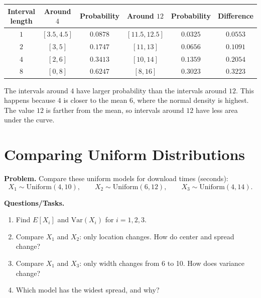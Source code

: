 \begin{enumerate}[label=\textbf{\alph*)}]
	
	\begin{center}
		\begin{tabular}{c c c c c c}
			\hline
			Interval length & Around \(4\) & Probability & Around \(12\) & Probability & Difference \\
			\hline
			\(1\) & \([3.5,4.5]\) & \(0.0878\) & \([11.5,12.5]\) & \(0.0325\) & \(0.0553\) \\
			\(2\) & \([3,5]\) & \(0.1747\) & \([11,13]\) & \(0.0656\) & \(0.1091\) \\
			\(4\) & \([2,6]\) & \(0.3413\) & \([10,14]\) & \(0.1359\) & \(0.2054\) \\
			\(8\) & \([0,8]\) & \(0.6247\) & \([8,16]\) & \(0.3023\) & \(0.3223\) \\
			\hline
		\end{tabular}
	\end{center}
	
	The intervals around \(4\) have larger probability than the intervals around \(12\). This happens because \(4\) is closer to the mean \(6\), where the normal density is highest. The value \(12\) is farther from the mean, so intervals around \(12\) have less area under the curve.
	
\end{enumerate}

\section{Comparing Uniform Distributions}

\textbf{Problem.}
Compare these uniform models for download times (seconds):
\[
X_1\sim \text{Uniform}(4,10),\qquad X_2\sim \text{Uniform}(6,12),\qquad X_3\sim \text{Uniform}(4,14).
\]

\textbf{Questions/Tasks.}
\begin{enumerate}[label=\textbf{\alph*)}]
  \item Find \(E[X_i]\) and \(\mathrm{Var}(X_i)\) for \(i=1,2,3\).
  \item Compare \(X_1\) and \(X_2\): only location changes. How do center and spread change?
  \item Compare \(X_1\) and \(X_3\): only width changes from 6 to 10. How does variance change?
  \item Which model has the widest spread, and why?
\end{enumerate}

